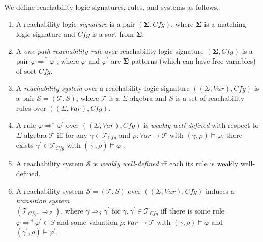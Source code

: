 \documentclass{article}
\newcommand{\Var}{\mathit{Var}}
\newcommand{\Tcfg}{\mathcal{T}_{\mathit{Cfg}}}
\begin{document}
\begin{definition}\label{def:basics}
We define reachability-logic signatures, rules, and systems as follows.
\begin{enumerate}
    \item A reachability-logic \emph{signature} is a pair $(\mathbf{\Sigma}, \mathit{Cfg})$,
          where $\mathbf{\Sigma}$ is a matching logic signature and $\mathit{Cfg}$ is a sort from $\mathbf{\Sigma}$.
          
    \item A \emph{one-path reachability rule} over reachability logic signature $(\mathbf{\Sigma}, \mathit{Cfg})$        is a pair $\varphi \Rightarrow^\exists \varphi^\prime$,
          where $\varphi$ and $\varphi^\prime$
          are $\mathbf{\Sigma}$-patterns (which can have free variables) of sort $\mathit{Cfg}$.
          
    \item A \emph{reachability system} over a reachability-logic signature $((\Sigma, \mathit{Var}), \mathit{Cfg})$
          is a pair $\mathcal{S} = (\mathcal{T}, S)$, where $\mathcal{T}$ is a $\Sigma$-algebra
          and $S$ is a set of reachability rules over $((\Sigma, \mathit{Var}), \mathit{Cfg})$.
          
    \item A rule $\varphi \Rightarrow^\exists \varphi^\prime$ over $((\Sigma, \mathit{Var}), \mathit{Cfg})$
          is \emph{weakly well-defined}
          with respect to $\Sigma$-algebra $\mathcal{T}$
          iff
          for any $\gamma \in \Tcfg$ and $\rho : \Var \to \mathcal{T}$
          with $(\gamma, \rho) \vDash \varphi$,
          there exists $\gamma^\prime \in \Tcfg$ with $(\gamma^\prime , \rho) \vDash \varphi^\prime$.
          
    \item A reachability system $\mathcal{S}$ is \emph{weakly well-defined} iff each its rule is weakly     
          well-defined.
          
    \item A reachability system $\mathcal{S} = (\mathcal{T}, S)$ over $((\Sigma, \mathit{Var}), \mathit{Cfg})$ induces
          a \emph{transition system} \\
          $(\Tcfg , \Rightarrow_{\mathcal{S}})$,
          where $\gamma \Rightarrow_{\mathcal{S}} \gamma^\prime$
          for $\gamma, \gamma^\prime \in \Tcfg$
          iff there is some rule \\ $\varphi \Rightarrow^\exists \varphi^\prime \in S$
          and some valuation $\rho : \Var \to \mathcal{T}$ with $(\gamma, \rho) \vDash \varphi$
          and $(\gamma^\prime , \rho) \vDash \varphi^\prime$.


\end{enumerate}
\end{definition}
\end{document}
